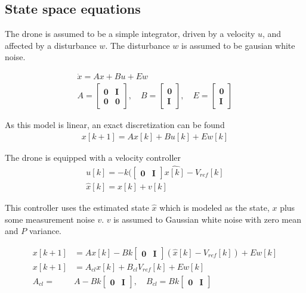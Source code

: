 \subsection{State space equations}

The drone is assumed to be a simple integrator, driven by a velocity $u$, and affected by a disturbance $w$. The disturbance $w$ is assumed to be gausian white noise. 

\begin{align}
    \dot{x}  = A x + B u + E w\\
    A  = \begin{bmatrix} \mathbf{0} & \mathbf{I} \\ \mathbf{0} & \mathbf{0} \end{bmatrix}, \quad 
    B  = \begin{bmatrix} \mathbf{0}  \\ \mathbf{I} \end{bmatrix} , \quad 
    E  = \begin{bmatrix} \mathbf{0}  \\ \mathbf{I} \end{bmatrix} 
\end{align}

As this model is linear, an exact discretization can be found
\begin{align}
    x[k+1]  = A x[k] + B u[k] + E w[k]
\end{align}

The drone is equipped with a velocity controller
\begin{align}
    u[k] = - k ( \begin{bmatrix} \mathbf{0} & \mathbf{I} \end{bmatrix} \hat{x[k]} - V_{ref}[k] \\
    \hat{x}[k] = x[k] + v[k]
\end{align}

This controller uses the estimated state $\hat{x}$ which is modeled as the state, $x$ plus some measurement noise $v$. $v$ is assumed to Gaussian white noise with zero mean and $P$ variance. 

\begin{align}
    x[k+1] & = A x[k] - B k \begin{bmatrix} \mathbf{0} & \mathbf{I} \end{bmatrix} (\hat{x}[k] - V_{ref}[k]) + E w[k] \\
    x[k+1] & = A_{cl} x[k] + B_{cl} V_{ref}[k] + E w[k] \\
    A_{cl}  = &A - B k \begin{bmatrix} \mathbf{0} & \mathbf{I} \end{bmatrix}, \quad B_{cl} = B k \begin{bmatrix} \mathbf{0} & \mathbf{I} \end{bmatrix}
\end{align}


